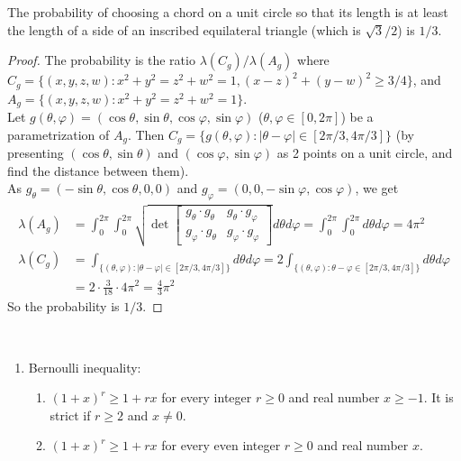 \documentclass{treatise}
\begin{document}
\begin{shaded}
\begin{theorem}
The probability of choosing a chord on a unit circle so that its length is at least the length of a side of an inscribed equilateral triangle (which is $\sqrt{3}/2$) is $1/3$.
\end{theorem}
\begin{proof}
The probability is the ratio $\lambda (C_g)/ \lambda(A_g)$ where $C_g = \{ (x, y, z, w) : x^2 + y^2 = z^2 + w^2 = 1, (x - z)^2 + (y - w)^2 \geq 3/4 \}$, and $A_g = \{ (x, y, z, w) : x^2 + y^2 = z^2 + w^2 = 1 \}$.
\\
Let $g(\theta, \varphi) = (\cos \theta, \sin \theta, \cos \varphi, \sin \varphi)$ ($\theta, \varphi \in [0, 2\pi]$) be a parametrization of $A_g$. Then $C_g = \{ g(\theta, \varphi) : |\theta - \varphi| \in [2 \pi / 3, 4 \pi / 3] \}$ (by presenting $(\cos \theta, \sin \theta)$ and $(\cos \varphi, \sin \varphi)$ as 2 points on a unit circle, and find the distance between them).
\\
As $g_\theta = (-\sin \theta, \cos \theta, 0, 0)$ and $g_\varphi = (0, 0, -\sin \varphi, \cos \varphi)$, we get
\begin{align*}
\lambda(A_g) & = \int_0^{2 \pi} \int_0^{2 \pi} \sqrt{\det \begin{bmatrix}
g_\theta \cdot g_\theta & g_\theta \cdot g_\varphi \\
g_\varphi \cdot g_\theta & g_\varphi \cdot g_\varphi
\end{bmatrix}} d \theta d \varphi = \int_0^{2 \pi} \int_0^{2 \pi} d \theta d \varphi = 4\pi^2
\\
\lambda(C_g) & = \int_{\{(\theta, \varphi) : |\theta - \varphi| \in [2 \pi/3, 4 \pi/3] \}} d \theta d \varphi = 2 \int_{\{(\theta, \varphi) : \theta - \varphi \in [2 \pi/3, 4 \pi/3] \}} d \theta d \varphi
\\
& = 2 \cdot \frac{3}{18} \cdot 4 \pi^2 = \frac{4}{3} \pi^2
\end{align*}
So the probability is $1/3$.
\end{proof}
\begin{theorem}[Inequalities] \ 
\begin{enumerate}
	\item Bernoulli inequality:
	\begin{enumerate}
		\item $(1 + x)^r \geq 1 + rx$ for every integer $r \geq 0$ and real number $x \geq -1$. It is strict if $r \geq 2$ and $x \neq 0$.
		\item $(1 + x)^r \geq 1 + rx$ for every even integer $r \geq 0$ and real number $x$.

\end{enumerate}
\end{enumerate}
\end{theorem}
\end{shaded}
\end{document}
